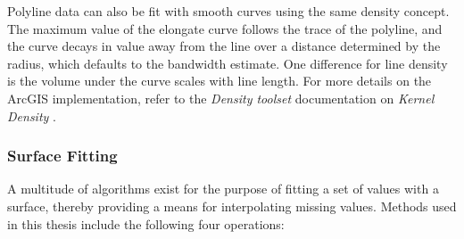 Polyline data can also be fit with smooth curves using the same density concept. The maximum value of the elongate curve follows the trace of the polyline, and the curve decays in value away from the line over a distance determined by the radius, which defaults to the bandwidth estimate. One difference for line density is the volume under the curve scales with line length. For more details on the ArcGIS implementation, refer to the \textit{Density toolset} documentation on \textit{Kernel Density} \citep{esri_how_2021-3}.

\subsubsection{Surface Fitting}

A multitude of algorithms exist for the purpose of fitting a set of values with a surface, thereby providing a means for interpolating missing values. Methods used in this thesis include the following four operations:

